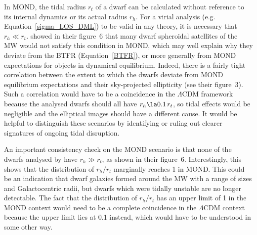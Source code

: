\documentclass[fleqn,usenatbib,useAMS,onecolumn]{mnras} %
\begin{document}
In MOND, the tidal radius $r_t$ of a dwarf can be calculated without reference to its internal dynamics or its actual radius $r_h$. For a virial analysis (e.g. Equation~\ref{sigma_LOS_DML}) to be valid in any theory, it is necessary that $r_h \ll r_t$. \citet{McGaugh_Wolf_2010} showed in their figure~6 that many dwarf spheroidal satellites of the MW would not satisfy this condition in MOND, which may well explain why they deviate from the BTFR (Equation~\ref{BTFR}), or more generally from MOND expectations for objects in dynamical equilibrium. Indeed, there is a fairly tight correlation between the extent to which the dwarfs deviate from MOND equilibrium expectations and their sky-projected ellipticity (see their figure~3). Such a correlation would have to be a coincidence in the $\Lambda$CDM framework because the analysed dwarfs should all have $r_h \la 0.1 \, r_t$, so tidal effects would be negligible and the elliptical images should have a different cause. It would be helpful to distinguish these scenarios by identifying or ruling out clearer signatures of ongoing tidal disruption.

An important consistency check on the MOND scenario is that none of the dwarfs analysed by \citet{McGaugh_Wolf_2010} have $r_h \gg r_t$, as shown in their figure~6. Interestingly, this shows that the distribution of $r_h/r_t$ marginally reaches 1 in MOND. This could be an indication that dwarf galaxies formed around the MW with a range of sizes and Galactocentric radii, but dwarfs which were tidally unstable are no longer detectable. The fact that the distribution of $r_h/r_t$ has an upper limit of 1 in the MOND context would need to be a complete coincidence in the $\Lambda$CDM context because the upper limit lies at 0.1 instead, which would have to be understood in some other way.
\end{document}
